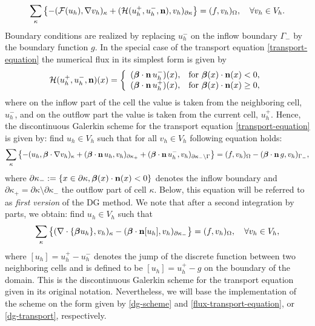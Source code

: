 \documentclass[11pt]{article}
\begin{document}
\begin{equation}\label{dg-scheme}
  \sum_\kappa\left\{-({\mathcal F}(u_h),\nabla v_h)_\kappa+({\mathcal H}(u_h^+,u_h^-,{\bf n}), v_h)_{\partial\kappa}\right\}=(f,v_h)_\Omega, \quad\forall v_h\in V_h.
\end{equation}
Boundary conditions are realized by replacing $u_h^-$ on the inflow boundary $\Gamma_-$ by the boundary function $g$.
In the special case of the transport equation
\eqref{transport-equation} the numerical flux in its simplest form
is given by
\begin{equation}\label{flux-transport-equation}
  {\mathcal H}(u_h^+,u_h^-,{\bf n})(x)=\left\{\begin{array}{ll}
      (\boldsymbol\beta\cdot{\bf n}\, u_h^-)(x),&\mbox{for } \boldsymbol\beta(x)\cdot{\bf n}(x)<0,\\
      (\boldsymbol\beta\cdot{\bf n}\, u_h^+)(x),&\mbox{for } \boldsymbol\beta(x)\cdot{\bf n}(x)\geq 0,
\end{array}
\right.
\end{equation}
where on the inflow part of the cell the value is taken from the
neighboring cell, $u_h^-$, and on the outflow part the value is
taken from the current cell, $u_h^+$.  Hence, the discontinuous Galerkin
scheme for the transport equation \eqref{transport-equation} is given
by: find $u_h\in V_h$ such that for all $v_h\in V_h$ following
equation holds:
\begin{equation}\label{dg-transport}
  \sum_\kappa\left\{-(u_h,\boldsymbol\beta\cdot\nabla v_h)_\kappa
  +(\boldsymbol\beta\cdot{\bf n}\, u_h, v_h)_{\partial\kappa_+}
  +(\boldsymbol\beta\cdot{\bf n}\, u_h^-, v_h)_{\partial\kappa_-\setminus\Gamma}\right\}
  =(f,v_h)_\Omega-(\boldsymbol\beta\cdot{\bf n}\, g, v_h)_{\Gamma_-},
\end{equation}
where $\partial\kappa_-:=\{x\in\partial\kappa,
\boldsymbol\beta(x)\cdot{\bf n}(x)<0\}$ denotes the inflow boundary
and $\partial\kappa_+=\partial\kappa\setminus \partial \kappa_-$ the
outflow part of cell $\kappa$. Below, this equation will be referred
to as \emph{first version} of the DG method. We note that after a
second integration by parts, we obtain: find $u_h\in V_h$ such that
\[
  \sum_\kappa\left\{(\nabla\cdot\{\boldsymbol\beta u_h\},v_h)_\kappa
  -(\boldsymbol\beta\cdot{\bf n} [u_h], v_h)_{\partial\kappa_-}\right\}
  =(f,v_h)_\Omega, \quad\forall v_h\in V_h,
\]
where $[u_h]=u_h^+-u_h^-$ denotes the jump of the discrete function
between two neighboring cells and is defined to be $[u_h]=u_h^+-g$ on
the boundary of the domain. This is the discontinuous Galerkin scheme
for the transport equation given in its original notation.
Nevertheless, we will base the implementation of the scheme on the
form given by \eqref{dg-scheme} and \eqref{flux-transport-equation},
or \eqref{dg-transport}, respectively.
\end{document}
